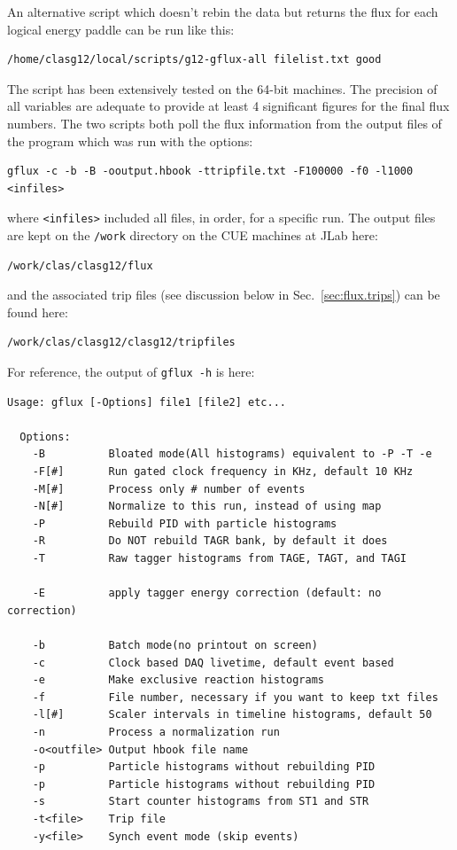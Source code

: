 An alternative script which doesn't rebin the data but returns the flux for each logical energy paddle can be run like this:
\begin{verbatim}
/home/clasg12/local/scripts/g12-gflux-all filelist.txt good
\end{verbatim}
The script has been extensively tested on the 64-bit machines. The precision of all variables are adequate to provide at least 4 significant figures for the final flux numbers. The two scripts both poll the flux information from the output files of the program  which was run with the options:
\begin{verbatim}
gflux -c -b -B -ooutput.hbook -ttripfile.txt -F100000 -f0 -l1000 <infiles>
\end{verbatim}
where \verb+<infiles>+ included all files, in order, for a specific run. The output files are kept on the \verb+/work+ directory on the CUE machines at JLab here:
\begin{verbatim}
/work/clas/clasg12/flux
\end{verbatim}
and the associated trip files (see discussion below in Sec.~\ref{sec:flux.trips}) can be found here:
\begin{verbatim}
/work/clas/clasg12/clasg12/tripfiles
\end{verbatim}
For reference, the output of \verb+gflux -h+ is here:
\begin{verbatim}
Usage: gflux [-Options] file1 [file2] etc...

  Options:
    -B          Bloated mode(All histograms) equivalent to -P -T -e
    -F[#]       Run gated clock frequency in KHz, default 10 KHz
    -M[#]       Process only # number of events
    -N[#]       Normalize to this run, instead of using map
    -P          Rebuild PID with particle histograms
    -R          Do NOT rebuild TAGR bank, by default it does
    -T          Raw tagger histograms from TAGE, TAGT, and TAGI

    -E          apply tagger energy correction (default: no correction)

    -b          Batch mode(no printout on screen)
    -c          Clock based DAQ livetime, default event based
    -e          Make exclusive reaction histograms
    -f          File number, necessary if you want to keep txt files
    -l[#]       Scaler intervals in timeline histograms, default 50
    -n          Process a normalization run
    -o<outfile> Output hbook file name
    -p          Particle histograms without rebuilding PID
    -p          Particle histograms without rebuilding PID
    -s          Start counter histograms from ST1 and STR
    -t<file>    Trip file
    -y<file>    Synch event mode (skip events)
\end{verbatim}

